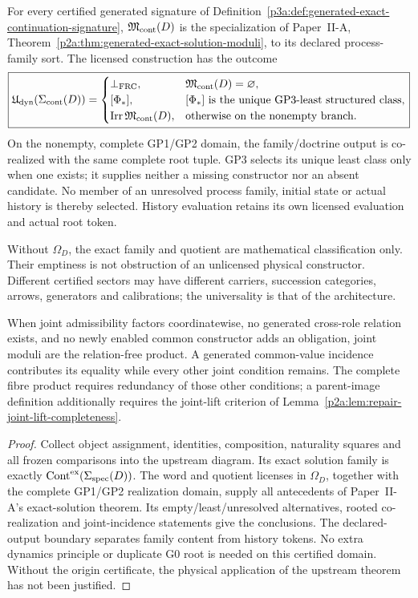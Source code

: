 \documentclass[12pt,a4paper]{article}
\begin{document}
\begin{theorem}
\label{p3a:thm:universal-generated-exact-continuation}
For every certified generated signature of
Definition~\ref{p3a:def:generated-exact-continuation-signature},
\(\mathfrak M_{\rm cont}(D)\) is the specialization of Paper~II-A,
Theorem~\ref{p2a:thm:generated-exact-solution-moduli}, to its declared
process-family sort. The licensed construction has the outcome
\[
 \boxed{\mathfrak U_{\rm dyn}(\Sigma_{\rm cont}(D))=
 \begin{cases}
 \bot_{\rm FRC},&\mathfrak M_{\rm cont}(D)=\varnothing,\\
 [\Phi_*],&[\Phi_*]\text{ is the unique GP3-least structured class},\\
 \operatorname{Irr}\mathfrak M_{\rm cont}(D),&
   \text{otherwise on the nonempty branch}.
 \end{cases}}
\]
On the nonempty, complete GP1/GP2 domain, the family/doctrine output is
co-realized with the same complete root tuple. GP3 selects its unique least
class only when one exists; it supplies neither a missing constructor nor an
absent candidate. No member of an unresolved process family, initial state
or actual history is thereby selected. History evaluation retains its own
licensed evaluation and actual root token.

Without \(\Omega_D\), the exact family and quotient are mathematical
classification only. Their emptiness is not obstruction of an unlicensed
physical constructor. Different certified sectors may have different
carriers, succession categories, arrows, generators and calibrations; the
universality is that of the architecture.

When joint admissibility factors coordinatewise, no generated cross-role
relation exists, and no newly enabled common constructor adds an obligation,
joint moduli are the relation-free product. A generated common-value
incidence contributes its equality while every other joint condition remains.
The complete fibre product requires redundancy of those other conditions;
a parent-image definition additionally requires the joint-lift criterion of
Lemma~\ref{p2a:lem:repair-joint-lift-completeness}.
\end{theorem}
\begin{proof}
Collect object assignment, identities, composition, naturality squares and
all frozen comparisons into the upstream diagram. Its exact solution family
is exactly \(\operatorname{Cont}^{\rm ex}(\Sigma_{\rm spec}(D))\).
The word and quotient licenses in \(\Omega_D\), together with the
complete GP1/GP2 realization domain, supply all antecedents of Paper~II-A's
exact-solution theorem. Its empty/least/unresolved alternatives, rooted
co-realization and joint-incidence statements give the conclusions. The
declared-output boundary separates family content from history tokens.
No extra dynamics principle or duplicate G0 root is needed on this certified
domain. Without the origin certificate, the physical application of the
upstream theorem has not been justified.
\end{proof}
\end{document}

